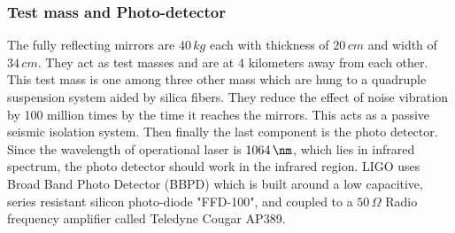 \subsubsection{Test mass and Photo-detector}

The fully reflecting mirrors are $40 \,kg$ each with thickness of $20\,cm$ and width of $34\,cm$. They act as test masses and are at 4 kilometers away from each other. This test mass is one among three other mass which are hung to a quadruple suspension system aided by silica fibers. They reduce the effect of noise vibration by 100 million times by the time it reaches the mirrors. This acts as a passive seismic isolation system. \cite{mirrors} Then finally the last component is the photo detector. Since the wavelength of operational laser is $1064\,\nm$, which lies in infrared spectrum, the photo detector should work in the infrared region. LIGO uses Broad Band Photo Detector (BBPD) which is built around a low capacitive, series resistant silicon photo-diode "FFD-100", and coupled to a $50\,\Omega$  Radio frequency amplifier called Teledyne Cougar AP389. \cite{BBPD}

\pagebreak
